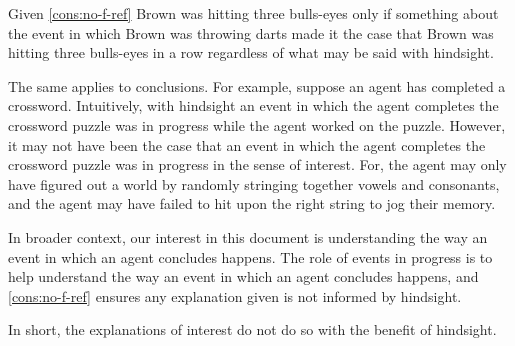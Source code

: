 \begin{note}
  Given \autoref{cons:no-f-ref} Brown was hitting three bulls-eyes only if something about the event in which Brown was throwing darts made it the case that Brown was hitting three bulls-eyes in a row regardless of what may be said with hindsight.

  The same applies to conclusions.
  For example, suppose an agent has completed a crossword.
  Intuitively, with hindsight an event in which the agent completes the crossword puzzle was in progress while the agent worked on the puzzle.
  However, it may not have been the case that an event in which the agent completes the crossword puzzle was in progress in the sense of interest.
  For, the agent may only have figured out a world by randomly stringing together vowels and consonants, and the agent may have failed to hit upon the right string to jog their memory.
\end{note}


\begin{note}
  In broader context, our interest in this document is understanding the way an event in which an agent concludes happens.
  The role of events in progress is to help understand the way an event in which an agent concludes happens, and \autoref{cons:no-f-ref} ensures any explanation given is not informed by hindsight.

  In short, the explanations of interest do not do so with the benefit of hindsight.
\end{note}






